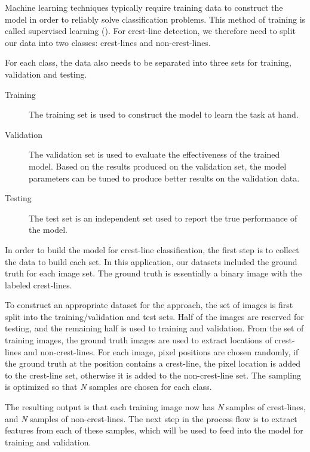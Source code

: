 Machine learning techniques typically require training data to construct the model in order to reliably solve classification problems. This method of training is called supervised learning (\cite{foundations_machine_learning_book,machine_learning_book}). For crest-line detection, we therefore need to split our data into two classes: crest-lines and non-crest-lines. 

For each class, the data also needs to be separated into three sets for training, validation and testing. 

\begin{description}
	\item [Training] The training set is used to construct the model to learn the task at hand.
	\item [Validation] The validation set is used to evaluate the effectiveness of the trained model. Based on the results produced on the validation set, the model parameters can be tuned to produce better results on the validation data.
	\item [Testing] The test set is an independent set used to report the true performance of the model.
\end{description}

In order to build the model for crest-line classification, the first step is to collect the data to build each set. In this application, our datasets included the ground truth for each image set. The ground truth is essentially a binary image with the labeled crest-lines. 

To construct an appropriate dataset for the approach, the set of images is first split into the training/validation and test sets. Half of the images are reserved for testing, and the remaining half is used to training and validation. From the set of training images, the ground truth images are used to extract locations of crest-lines and non-crest-lines. For each image, pixel positions are chosen randomly, if the ground truth at the position contains a crest-line, the pixel location is added to the crest-line set, otherwise it is added to the non-crest-line set. The sampling is optimized so that \emph{N} samples are chosen for each class.

The resulting output is that each training image now has \emph{N} samples of crest-lines, and \emph{N} samples of non-crest-lines. The next step in the process flow is to extract features from each of these samples, which will be used to feed into the model for training and validation.

